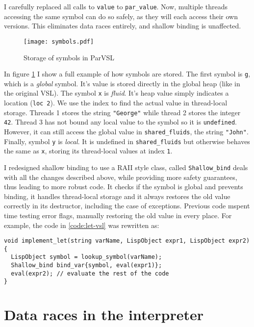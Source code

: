 I carefully replaced all calls to \texttt{value} to \texttt{par\_value}. Now, multiple threads accessing the same symbol
can do so safely, as they will each access their own versions. This eliminates data races entirely,
and shallow binding is unaffected.

\begin{figure}[H]
  \centering
  \texttt{[image: symbols.pdf]}
  \caption{Storage of symbols in ParVSL}
  \label{fig:symbols}
\end{figure}

In figure \ref{fig:symbols} I show a full example of how symbols are stored. The first symbol is \texttt{g}, which
is a \emph{global} symbol. It's value is stored directly in the global heap (like in the original VSL). The symbol \texttt{x}
is \emph{fluid}. It's heap value simply indicates a location (\texttt{loc 2}). We use the index to find the actual value
in thread-local storage. Threads 1 stores the string \texttt{"George"} while thread 2 stores the integer \texttt{42}.
Thread 3 has not bound any local value to the symbol so it is \texttt{undefined}. However, it can still access the
global value in \verb|shared_fluids|, the string \verb|"John"|. Finally, symbol \verb|y| is \emph{local}. It is
undefined in \verb|shared_fluids| but otherwise behaves the same as \verb|x|, storing its thread-local values at
index \verb|1|.

I redesigned shallow binding to use a RAII style class, called \verb|Shallow_bind| deals with all the changes
described above, while providing more safety guarantees, thus leading to more robust code. It checks if the symbol is global and prevents binding,
it handles thread-local storage and it always restores the old value correctly in its destructor, including the
case of exceptions. Previous code mspent time testing error flags, manually restoring the old value in every place.
For example, the code in \ref{code:let-vsl} was rewritten as:
\begin{code}
\begin{verbatim}
void implement_let(string varName, LispObject expr1, LispObject expr2) {
  LispObject symbol = lookup_symbol(varName);
  Shallow_bind bind_var{symbol, eval(expr1)};
  eval(expr2); // evaluate the rest of the code
}
\end{verbatim}
  \caption{Implementation of \texttt{let} in ParVSL.}
  \label{code:let-parvsl}
\end{code}

\section{Data races in the interpreter}
\label{sec:datarace}

